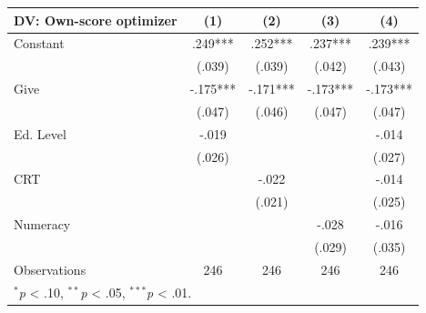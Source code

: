 \begingroup
\centering
\begin{tabular*}{\linewidth}{@{\extracolsep{\fill}}lcccc}
   \toprule
   DV: Own-score optimizer & \multicolumn{1}{c}{(1)} & \multicolumn{1}{c}{(2)} & \multicolumn{1}{c}{(3)} & \multicolumn{1}{c}{(4)}\\
   \midrule
   Constant & \mbox{\hphantom{8}.249***} & \mbox{\hphantom{8}.252***} & \mbox{\hphantom{8}.237***} & \mbox{\hphantom{8}.239***}\\
    & \mbox{(.039)\hphantom{88}} & \mbox{(.039)\hphantom{88}} & \mbox{(.042)\hphantom{88}} & \mbox{(.043)\hphantom{88}}\\
   Give & \mbox{-.175***} & \mbox{-.171***} & \mbox{-.173***} & \mbox{-.173***}\\
    & \mbox{(.047)\hphantom{88}} & \mbox{(.046)\hphantom{88}} & \mbox{(.047)\hphantom{88}} & \mbox{(.047)\hphantom{88}}\\
   Ed. Level & \mbox{-.019\hphantom{888}} &  &  & \mbox{-.014\hphantom{888}}\\
    & \mbox{(.026)\hphantom{88}} &  &  & \mbox{(.027)\hphantom{88}}\\
   CRT &  & \mbox{-.022\hphantom{888}} &  & \mbox{-.014\hphantom{888}}\\
    &  & \mbox{(.021)\hphantom{88}} &  & \mbox{(.025)\hphantom{88}}\\
   Numeracy &  &  & \mbox{-.028\hphantom{888}} & \mbox{-.016\hphantom{888}}\\
    &  &  & \mbox{(.029)\hphantom{88}} & \mbox{(.035)\hphantom{88}}\\
   \midrule
   Observations & 246 & 246 & 246 & 246\\
   \multicolumn{5}{l}{\footnotesize $^{*}$\textit{p} < .10, $^{**}$\textit{p} < .05, $^{***}$\textit{p} < .01.}\\
   \bottomrule
\end{tabular*}
\par\endgroup
